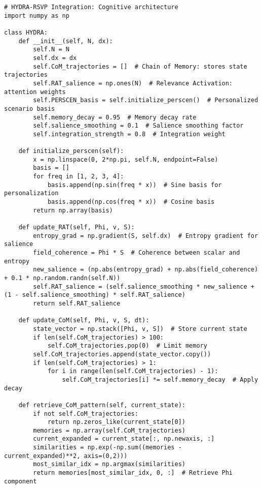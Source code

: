\documentclass[12pt]{book}
\theoremstyle{definition}
\begin{document}
\begin{lstlisting}[caption={HYDRA-RSVP Integration}, label={lst:hydra_code}]
# HYDRA-RSVP Integration: Cognitive architecture
import numpy as np

class HYDRA:
    def __init__(self, N, dx):
        self.N = N
        self.dx = dx
        self.CoM_trajectories = []  # Chain of Memory: stores state trajectories
        self.RAT_salience = np.ones(N)  # Relevance Activation: attention weights
        self.PERSCEN_basis = self.initialize_perscen()  # Personalized scenario basis
        self.memory_decay = 0.95  # Memory decay rate
        self.salience_smoothing = 0.1  # Salience smoothing factor
        self.integration_strength = 0.8  # Integration weight

    def initialize_perscen(self):
        x = np.linspace(0, 2*np.pi, self.N, endpoint=False)
        basis = []
        for freq in [1, 2, 3, 4]:
            basis.append(np.sin(freq * x))  # Sine basis for personalization
            basis.append(np.cos(freq * x))  # Cosine basis
        return np.array(basis)

    def update_RAT(self, Phi, v, S):
        entropy_grad = np.gradient(S, self.dx)  # Entropy gradient for salience
        field_coherence = Phi * S  # Coherence between scalar and entropy
        new_salience = (np.abs(entropy_grad) + np.abs(field_coherence) + 0.1 * np.random.randn(self.N))
        self.RAT_salience = (self.salience_smoothing * new_salience + (1 - self.salience_smoothing) * self.RAT_salience)
        return self.RAT_salience

    def update_CoM(self, Phi, v, S, dt):
        state_vector = np.stack([Phi, v, S])  # Store current state
        if len(self.CoM_trajectories) > 100:
            self.CoM_trajectories.pop(0)  # Limit memory
        self.CoM_trajectories.append(state_vector.copy())
        if len(self.CoM_trajectories) > 1:
            for i in range(len(self.CoM_trajectories) - 1):
                self.CoM_trajectories[i] *= self.memory_decay  # Apply decay

    def retrieve_CoM_pattern(self, current_state):
        if not self.CoM_trajectories:
            return np.zeros_like(current_state[0])
        memories = np.array(self.CoM_trajectories)
        current_expanded = current_state[:, np.newaxis, :]
        similarities = np.exp(-np.sum((memories - current_expanded)**2, axis=(0,2)))
        most_similar_idx = np.argmax(similarities)
        return memories[most_similar_idx, 0, :]  # Retrieve Phi component


\end{lstlisting}
\end{document}

